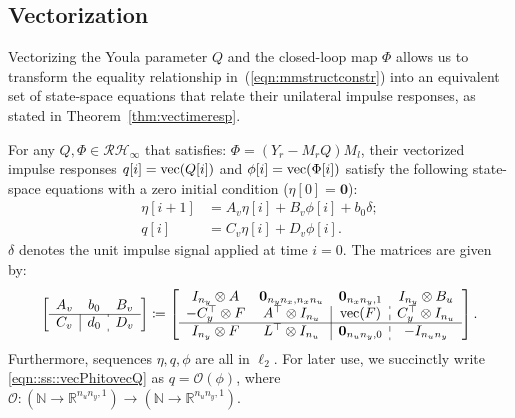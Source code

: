 
\subsection{Vectorization}
Vectorizing the Youla parameter $Q$ and the closed-loop map $\Phi$ allows us to transform the equality relationship in~(\ref{eqn:mmstructconstr}) into an equivalent set of state-space equations that relate their unilateral impulse responses, as stated in Theorem~\ref{thm:vectimeresp}.
\begin{thm}\label{thm:vectimeresp}
For any \(Q, \Phi\in \mathcal{RH}_\infty\) that satisfies: \(\Phi = (Y_r - M_r Q) M_l\), their vectorized impulse responses \(q[i] ={\mathrm{vec}}(Q[i])\) and \(\phi[i] ={\mathrm{vec}}(\Phi[i])\) satisfy the following state-space equations with a zero initial condition (\(\eta[0]=\mathbf{0}\)):
\begin{equation}\label{eqn::ss::vecPhitovecQ}
\begin{split}
    \eta[i+1] &=A_v \eta[i] +B_v \phi[i] +b_0 \delta; \\
    q[i] &= C_v \eta[i] +D_v \phi[i].
\end{split}
\end{equation}
\(\delta\) denotes the unit impulse signal applied at time \(i =0\). The matrices are given by:
\begin{equation}\label{eqn::ss::vecmat} 
\left[\begin{array}{c|c:c}
    A_v & b_0 & B_v \\
    \hline
    C_v & d_0 & D_v
\end{array}\right] \coloneqq 
\left[
\begin{array}{cc|c:c}
I_{n_y}\otimes A &  \mathbf{0}_{n_y n_x,n_x n_u} & \mathbf{0}_{n_x n_y,1} & I_{n_y} \otimes B_u\\
-C_y^\top \otimes F & A^\top\otimes I_{n_u} & \vc(F) & C_y^\top \otimes I_{n_u} \\
\hline
I_{n_y} \otimes F & L^\top \otimes I_{n_u} & \mathbf{0}_{n_u n_y,0} & -I_{n_u n_y} 
\end{array}\right].
\end{equation} 
Furthermore, sequences \(\eta,q,\phi\) are all in \(\ell_2\). For later use, we succinctly write \eqref{eqn::ss::vecPhitovecQ} as \(q = \mathcal{O}(\phi)\), where \(\mathcal{O} : \left( \mathbb{N} \to \mathbb{R}^{n_u n_y , 1} \right) \to \left( \mathbb{N} \to \mathbb{R}^{n_u n_y , 1} \right)\).


\end{thm}
